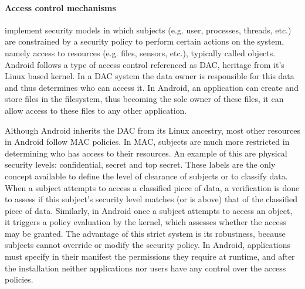 \paragraph{\textbf{Access control mechanisms}} implement security models in which subjects (e.g. user, processes, threads, etc.) are constrained by a security policy to perform certain actions on the system, namely access to resources (e.g. files, sensors, etc.), typically called objects. Android follows a type of access control referenced as \ac{DAC}, heritage from it's Linux based kernel. %
In a \ac{DAC} system the data owner is responsible for this data and thus determines who can access it. %
In Android, an application can create and store files in the filesystem, thus becoming the sole owner of these files, it can allow access to these files to any other application.

Although Android inherits the \ac{DAC} from its Linux ancestry, most other resources in Android follow \ac{MAC} policies. In \ac{MAC}, subjects are much more restricted in determining who has access to their resources. An example of this are physical security levels: confidential, secret and top secret. These labels are the only concept available to define the level of clearance of subjects or to classify data. When a subject attempts to access a classified piece of data, a verification is done to assess if this subject's security level matches (or is above) that of the classified piece of data. Similarly, in Android once a subject attempts to access an object, it triggers a policy evaluation by the kernel, which assesses whether the access may be granted. The advantage of this strict system is its robustness, because subjects cannot override or modify the security policy. In Android, applications must specify in their manifest the permissions they require at runtime, and after the installation neither applications nor users have any control over the access policies.


